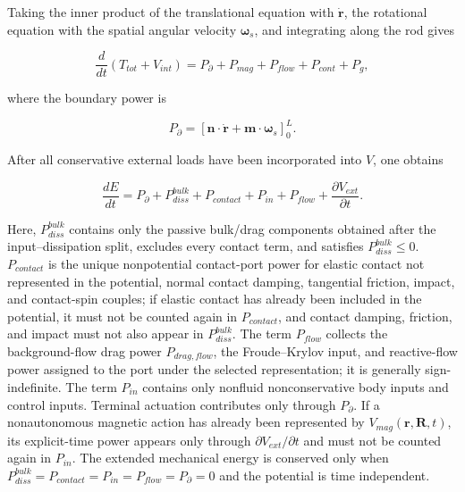 Taking the inner product of the translational equation with \(\dot{\mathbf{r}}\), the rotational equation with the spatial angular velocity \(\bm{\omega}_{s}\), and integrating along the rod gives

\begin{equation}
\label{eq:rod-1-103}
\frac{d}{dt}\left( T_{tot} + V_{int} \right) = P_{\partial} + P_{mag} + P_{flow} + P_{cont} + P_{g},
\end{equation}

where the boundary power is

\begin{equation}
\label{eq:rod-1-104}
P_{\partial} = \left\lbrack \mathbf{n} \cdot \dot{\mathbf{r}} + \mathbf{m} \cdot \bm{\omega}_{s} \right\rbrack_{0}^{L}.
\end{equation}

After all conservative external loads have been incorporated into \(V\), one obtains

\begin{equation}
\label{eq:rod-1-105}
\boxed{\frac{dE}{dt} = P_{\partial} + P_{diss}^{bulk} + P_{contact} + P_{in} + P_{flow} + \frac{\partial V_{ext}}{\partial t}.}
\end{equation}

Here, \(P_{diss}^{bulk}\) contains only the passive bulk/drag components obtained after the input--dissipation split, excludes every contact term, and satisfies \(P_{diss}^{bulk} \leq 0\). \(P_{contact}\) is the unique nonpotential contact-port power for elastic contact not represented in the potential, normal contact damping, tangential friction, impact, and contact-spin couples; if elastic contact has already been included in the potential, it must not be counted again in \(P_{contact}\), and contact damping, friction, and impact must not also appear in \(P_{diss}^{bulk}\). The term \(P_{flow}\) collects the background-flow drag power \(P_{drag,flow}\), the Froude--Krylov input, and reactive-flow power assigned to the port under the selected representation; it is generally sign-indefinite. The term \(P_{in}\) contains only nonfluid nonconservative body inputs and control inputs. Terminal actuation contributes only through \(P_{\partial}\). If a nonautonomous magnetic action has already been represented by \(V_{mag}\left( \mathbf{r},\mathbf{R},t \right)\), its explicit-time power appears only through \(\partial V_{ext}/\partial t\) and must not be counted again in \(P_{in}\). The extended mechanical energy is conserved only when \(P_{diss}^{bulk}=P_{contact}=P_{in}=P_{flow}=P_{\partial}=0\) and the potential is time independent.

